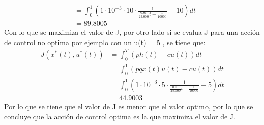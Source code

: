 \begin{itemize}
\begin{align}
	&= \int_{0}^{1} (1\cdot 10^{-3} \cdot 10 \cdot \frac{1}{\frac{0.01}{25.000}t + \frac{1}{10000}} - 10)dt\\
	&= 89.8005
\end{align}
Con lo que se maximiza el valor de J, por otro lado si se evalua J para una acción de control no optima por ejemplo con un u(t) = 5 , se tiene que:
\begin{align}
	J(x^{*}(t),u^{*}(t))&= \int_{0}^{T} (ph(t) - cu(t))dt\\
	&= \int_{0}^{1} (pqx(t)u(t) - cu(t))dt\\
	&= \int_{0}^{1} (1\cdot 10^{-3} \cdot 5 \cdot \frac{1}{\frac{0.01}{25.000}t + \frac{1}{10000}} - 5)dt\\
	&= 44.9003
\end{align}
Por lo que se tiene que el valor de J es menor que el valor optimo, por lo que se concluye que la acción de control optima es la que maximiza el valor de J.
\end{itemize}
